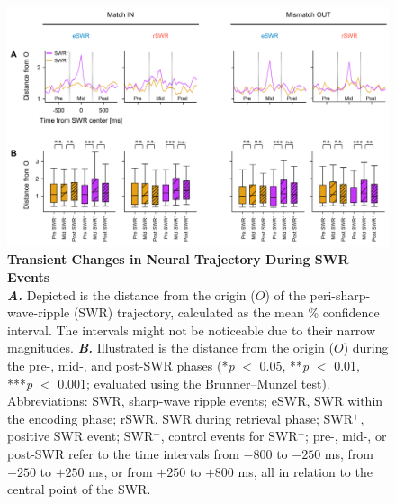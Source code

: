 \documentclass[final,3p,times,twocolumn]{elsarticle}
\begin{document}
        \clearpage
        \begin{figure}[ht]
        	\centering
            \includegraphics[width=1\textwidth]{./src/figures/.png/Figure_ID_05.png}
        	\caption{\textbf{
Transient Changes in Neural Trajectory During SWR Events
}
\smallskip
\\
\textbf{\textit{A.}} Depicted is the distance from the origin ($O$) of the peri-sharp-wave-ripple (SWR) trajectory, calculated as the mean \% confidence interval. The intervals might not be noticeable due to their narrow magnitudes. \textbf{\textit{B.}} Illustrated is the distance from the origin ($O$) during the pre-, mid-, and post-SWR phases (*\textit{p} $<$ 0.05, **\textit{p} $<$ 0.01, ***\textit{p} $<$ 0.001; evaluated using the Brunner--Munzel test). Abbreviations: SWR, sharp-wave ripple events; eSWR, SWR within the encoding phase; rSWR, SWR during retrieval phase; SWR$^+$, positive SWR event; SWR$^-$, control events for SWR$^+$; pre-, mid-, or post-SWR refer to the time intervals from $-800$ to $-250$ ms, from $-250$ to $+250$ ms, or from $+250$ to $+800$ ms, all in relation to the central point of the SWR.
}
        	\label{fig:05}
        \end{figure}
        \clearpage
\end{document}
